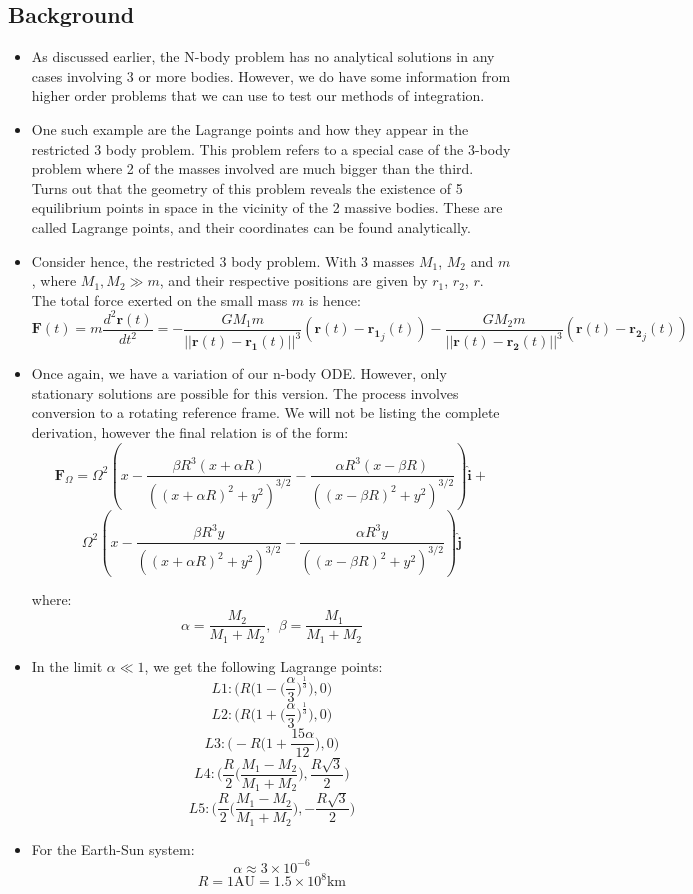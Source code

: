 \documentclass[11pt]{article}
\newcommand{\psubsubsection}[1]{{\subsection*{#1}}}
\begin{document}
    \psubsubsection{Background}
    \begin{itemize}
        \item As discussed earlier, the N-body problem has no analytical solutions in any cases involving 3 or more bodies. However, we do have some information from higher order problems that we can use to test our methods of integration.
        \item One such example are the Lagrange points and how they appear in the restricted 3 body problem. This problem refers to a special case of the 3-body problem where 2 of the masses involved are much bigger than the third. Turns out that the geometry of this problem reveals the existence of 5 equilibrium points in space in the vicinity of the 2 massive bodies. These are called Lagrange points, and their coordinates can be found analytically.
        \item Consider hence, the restricted 3 body problem. With 3 masses $M_1$, $M_2$ and $m$, where $M_1, M_2 \gg m$, and their respective positions are given by $r_1$, $r_2$, $r$. The total force exerted on the small mass $m$ is hence:
        \[ \mathbf{F}(t) = m\frac{d^2 \mathbf{r}(t)}{dt^2} = -\frac{G M_1 m}{|| \mathbf{r}(t) - \mathbf{r_1}(t) ||^3}(\mathbf{r}(t) - \mathbf{r_1}_j(t))-\frac{G M_2 m}{|| \mathbf{r}(t) - \mathbf{r_2}(t) ||^3}(\mathbf{r}(t) - \mathbf{r_2}_j(t)) \]
        \item Once again, we have a variation of our n-body ODE. However, only stationary solutions are possible for this version. The process involves conversion to a rotating reference frame. We will not be listing the complete derivation, however the final relation is of the form:
        \[ \mathbf{F}_{\Omega} = \Omega^2 \left(x-\frac{\beta R^3(x+\alpha R)}{((x+\alpha R)^2+y^2)^{3/2}}
        -\frac{\alpha R^3(x-\beta R)}{((x-\beta R)^2+y^2)^{3/2}}\right) \hat{\mathbf{i}} +\]
        \[\Omega^2 \left(x-\frac{\beta R^3 y}{((x+\alpha R)^2+y^2)^{3/2}}
        -\frac{\alpha R^3 y}{((x-\beta R)^2+y^2)^{3/2}}\right) \hat{\mathbf{j}} \]

        where:
        \[ \alpha = \frac{M_2}{M_1+M_2}, \ \ \beta = \frac{M_1}{M_1+M_2} \]

        \item In the limit $\alpha \ll 1$, we get the following Lagrange points:
        \[ L1: \bigg( R \bigg( 1-\bigg(\frac{\alpha}{3}\bigg)^{\frac{1}{3}} \bigg), 0 \bigg) \]
        \[ L2: \bigg( R \bigg( 1+\bigg(\frac{\alpha}{3}\bigg)^{\frac{1}{3}} \bigg), 0 \bigg) \]
        \[ L3: \bigg( -R \bigg( 1+\frac{15 \alpha}{12} \bigg), 0 \bigg) \]
        \[ L4: \bigg( \frac{R}{2} \bigg(\frac{M_1-M_2}{M_1+M_2} \bigg), \frac{R\sqrt{3}}{2} \bigg) \]
        \[ L5: \bigg( \frac{R}{2} \bigg(\frac{M_1-M_2}{M_1+M_2} \bigg), -\frac{R\sqrt{3}}{2} \bigg) \]

        \item For the Earth-Sun system:
        \[ \alpha \approx 3\times10^{-6} \]
        \[ R = 1 \text{AU} = 1.5 \times 10^8 \text{km} \]
    \end{itemize}
\end{document}
